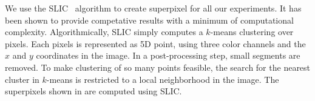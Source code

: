 We use the SLIC~\citep{achanta2012slic} algorithm to create superpixel for all
our experiments.  It has been shown to provide competative results with a
minimum of computational complexity.  Algorithmically, SLIC simply computes a
$k$-means clustering over pixels. Each pixels is represented as 5D point, using
three color channels and the $x$ and $y$ coordinates in the image.  In a
post-processing step, small segments are removed. To make clustering of so many
points feasible, the search for the nearest cluster in $k$-means is restricted
to a local neighborhood in the image. The superpixels shown in
 are computed using SLIC.


